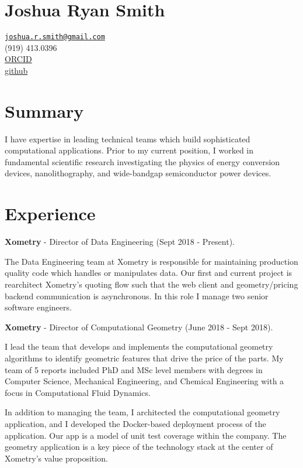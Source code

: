 \section{Joshua Ryan Smith}\label{joshua-ryan-smith}

\href{mailto:joshua.r.smith@gmail.com}{\nolinkurl{joshua.r.smith@gmail.com}}\\
(919) 413.0396\\
\href{http://orcid.org/0000-0002-3137-7180}{ORCID}\\
\href{http://github.com/jrsmith3}{github}

\section{Summary}\label{summary}

I have expertise in leading technical teams which build sophisticated
computational applications. Prior to my current position, I worked in
fundamental scientific research investigating the physics of energy
conversion devices, nanolithography, and wide-bandgap semiconductor
power devices.

\section{Experience}\label{experience}

\textbf{Xometry} - Director of Data Engineering (Sept 2018 - Present).

The Data Engineering team at Xometry is responsible for maintaining
production quality code which handles or manipulates data. Our first and
current project is rearchitect Xometry's quoting flow such that the web
client and geometry/pricing backend communication is asynchronous. In
this role I manage two senior software engineers.

\textbf{Xometry} - Director of Computational Geometry (June 2018 - Sept
2018).

I lead the team that develops and implements the computational geometry
algorithms to identify geometric features that drive the price of the
parts. My team of 5 reports included PhD and MSc level members with
degrees in Computer Science, Mechanical Engineering, and Chemical
Engineering with a focus in Computational Fluid Dynamics.

In addition to managing the team, I architected the computational
geometry application, and I developed the Docker-based deployment
process of the application. Our app is a model of unit test coverage
within the company. The geometry application is a key piece of the
technology stack at the center of Xometry's value proposition.

